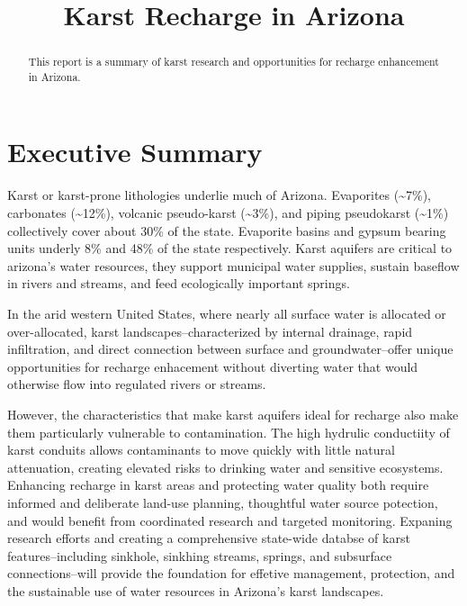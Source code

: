 \documentclass[
]{agujournal2019}
\begin{document}
\title{Karst Recharge in Arizona}



\begin{abstract}
This report is a summary of karst research and opportunities for
recharge enhancement in Arizona.
\end{abstract}





\section{Executive Summary}\label{executive-summary}

Karst or karst-prone lithologies underlie much of Arizona. Evaporites
(\textasciitilde7\%), carbonates (\textasciitilde12\%), volcanic
pseudo-karst (\textasciitilde3\%), and piping pseudokarst
(\textasciitilde1\%) collectively cover about 30\% of the state.
Evaporite basins and gypsum bearing units underly 8\% and 48\% of the
state respectively. Karst aquifers are critical to arizona's water
resources, they support municipal water supplies, sustain baseflow in
rivers and streams, and feed ecologically important springs.

In the arid western United States, where nearly all surface water is
allocated or over-allocated, karst landscapes--characterized by internal
drainage, rapid infiltration, and direct connection between surface and
groundwater--offer unique opportunities for recharge enhacement without
diverting water that would otherwise flow into regulated rivers or
streams.

However, the characteristics that make karst aquifers ideal for recharge
also make them particularly vulnerable to contamination. The high
hydrulic conductiity of karst conduits allows contaminants to move
quickly with little natural attenuation, creating elevated risks to
drinking water and sensitive ecosystems. Enhancing recharge in karst
areas and protecting water quality both require informed and deliberate
land-use planning, thoughtful water source potection, and would benefit
from coordinated research and targeted monitoring. Expaning research
efforts and creating a comprehensive state-wide databse of karst
features--including sinkhole, sinkhing streams, springs, and subsurface
connections--will provide the foundation for effetive management,
protection, and the sustainable use of water resources in Arizona's
karst landscapes.
\end{document}
